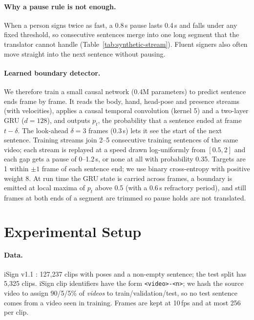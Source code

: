\documentclass[11pt]{article}
\begin{document}
\paragraph{Why a pause rule is not enough.} When a person signs twice as fast, a 0.8\,s pause lasts
0.4\,s and falls under any fixed threshold, so consecutive sentences merge into one long segment that
the translator cannot handle (Table~\ref{tab:synthetic-stream}). Fluent signers also often move
straight into the next sentence without pausing.

\paragraph{Learned boundary detector.} We therefore train a small causal network (0.4M parameters) to
predict sentence ends frame by frame. It reads the body, hand, head-pose and presence streams (with
velocities), applies a causal temporal convolution (kernel 5) and a two-layer GRU ($d{=}128$), and
outputs $p_t$, the probability that a sentence ended at frame $t-\delta$. The look-ahead $\delta = 3$
frames (0.3\,s) lets it see the start of the next sentence. Training streams join 2--5 consecutive
training sentences of the same video; each stream is replayed at a speed drawn log-uniformly from
$[0.5, 2]$ and each gap gets a pause of 0--1.2\,s, or none at all with probability 0.35. Targets are 1
within $\pm1$ frame of each sentence end; we use binary cross-entropy with positive weight 8. At run time
the GRU state is carried across frames, a boundary is emitted at local maxima of $p_t$ above 0.5 (with a
0.6\,s refractory period), and still frames at both ends of a segment are trimmed so pause holds are not
translated.

\section{Experimental Setup}

\paragraph{Data.} iSign v1.1 \citep{joshi2024isign}: 127{,}237 clips with poses and a non-empty
sentence; the test split has 5{,}325 clips. iSign
clip identifiers have the form \texttt{<video>-<n>}; we hash the source video to assign 90/5/5\% of
\emph{videos} to train/validation/test, so no test sentence comes from a video seen in training.
Frames are kept at 10\,fps and at most 256 per clip.
\end{document}
